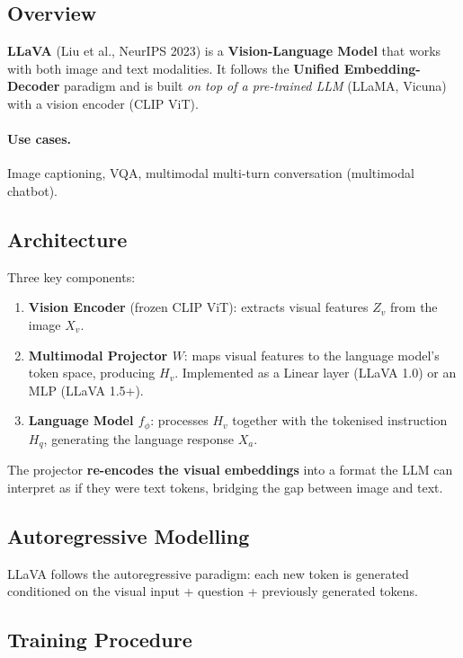 \documentclass[11pt,a4paper]{article}
\theoremstyle{definition}
\theoremstyle{plain}
\theoremstyle{remark}
\begin{document}
\subsection{Overview}

\textbf{LLaVA} (Liu et al., NeurIPS 2023) is a \textbf{Vision-Language Model} that works with both image and text modalities. It follows the \textbf{Unified Embedding-Decoder} paradigm and is built \emph{on top of a pre-trained LLM} (LLaMA, Vicuna) with a vision encoder (CLIP ViT).

\paragraph{Use cases.} Image captioning, VQA, multimodal multi-turn conversation (multimodal chatbot).

\subsection{Architecture}

Three key components:
\begin{enumerate}
    \item \textbf{Vision Encoder} (frozen CLIP ViT): extracts visual features $Z_v$ from the image $X_v$.
    \item \textbf{Multimodal Projector $W$}: maps visual features to the language model's token space, producing $H_v$. Implemented as a Linear layer (LLaVA 1.0) or an MLP (LLaVA 1.5+).
    \item \textbf{Language Model $f_\phi$}: processes $H_v$ together with the tokenised instruction $H_q$, generating the language response $X_a$.
\end{enumerate}

The projector \textbf{re-encodes the visual embeddings} into a format the LLM can interpret as if they were text tokens, bridging the gap between image and text.

\subsection{Autoregressive Modelling}

LLaVA follows the autoregressive paradigm: each new token is generated conditioned on the visual input + question + previously generated tokens.

\subsection{Training Procedure}
\end{document}
